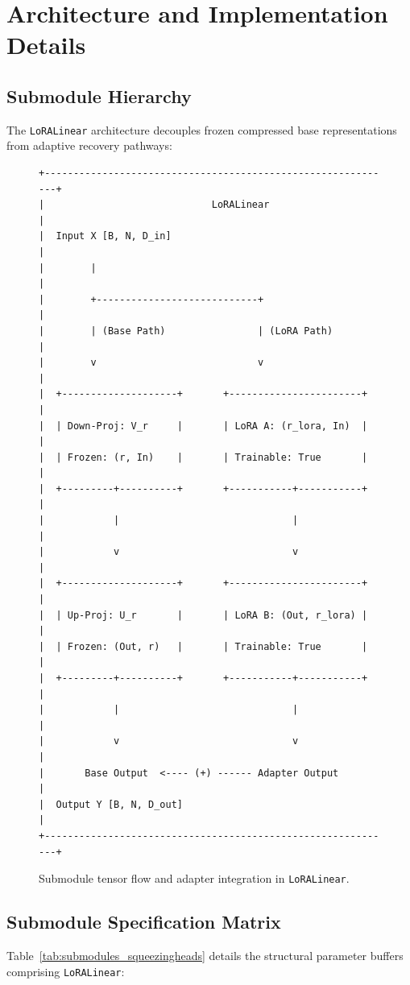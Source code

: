 \section{Architecture and Implementation Details}

\subsection{Submodule Hierarchy}
The \texttt{LoRALinear} architecture decouples frozen compressed base representations from adaptive recovery pathways:

\begin{figure}[H]
\centering
\begin{verbatim}
+-------------------------------------------------------------+
|                             LoRALinear                      |
|  Input X [B, N, D_in]                                       |
|        |                                                    |
|        +----------------------------+                       |
|        | (Base Path)                | (LoRA Path)           |
|        v                            v                       |
|  +--------------------+       +-----------------------+     |
|  | Down-Proj: V_r     |       | LoRA A: (r_lora, In)  |     |
|  | Frozen: (r, In)    |       | Trainable: True       |     |
|  +---------+----------+       +-----------+-----------+     |
|            |                              |                 |
|            v                              v                 |
|  +--------------------+       +-----------------------+     |
|  | Up-Proj: U_r       |       | LoRA B: (Out, r_lora) |     |
|  | Frozen: (Out, r)   |       | Trainable: True       |     |
|  +---------+----------+       +-----------+-----------+     |
|            |                              |                 |
|            v                              v                 |
|       Base Output  <---- (+) ------ Adapter Output          |
|  Output Y [B, N, D_out]                                     |
+-------------------------------------------------------------+
\end{verbatim}
\caption{Submodule tensor flow and adapter integration in \texttt{LoRALinear}.}
\end{figure}

\subsection{Submodule Specification Matrix}
Table~\ref{tab:submodules_squeezingheads} details the structural parameter buffers comprising \texttt{LoRALinear}:

